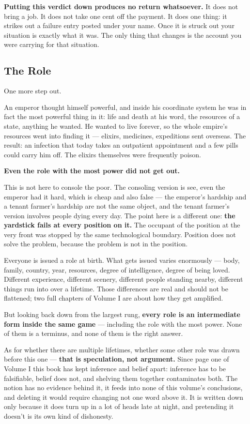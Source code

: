 \documentclass[11pt,a4paper]{article}
\begin{document}
\textbf{Putting this verdict down produces no return whatsoever.} It does not bring a job. It does not take one cent off the payment. It does one thing: it strikes out a failure entry posted under your name. Once it is struck out your situation is exactly what it was. The only thing that changes is the account you were carrying for that situation.

\subsection{The Role}

One more step out.

An emperor thought himself powerful, and inside his coordinate system he was in fact the most powerful thing in it: life and death at his word, the resources of a state, anything he wanted. He wanted to live forever, so the whole empire's resources went into finding it --- elixirs, medicines, expeditions sent overseas. The result: an infection that today takes an outpatient appointment and a few pills could carry him off. The elixirs themselves were frequently poison.

\textbf{Even the role with the most power did not get out.}

This is not here to console the poor. The consoling version is see, even the emperor had it hard, which is cheap and also false --- the emperor's hardship and a tenant farmer's hardship are not the same object, and the tenant farmer's version involves people dying every day. The point here is a different one: \textbf{the yardstick fails at every position on it.} The occupant of the position at the very front was stopped by the same technological boundary. Position does not solve the problem, because the problem is not in the position.

Everyone is issued a role at birth. What gets issued varies enormously --- body, family, country, year, resources, degree of intelligence, degree of being loved. Different experience, different scenery, different people standing nearby, different things run into over a lifetime. Those differences are real and should not be flattened; two full chapters of Volume I are about how they get amplified.

But looking back down from the largest rung, \textbf{every role is an intermediate form inside the same game} --- including the role with the most power. None of them is a terminus, and none of them is the right answer.

As for whether there are multiple lifetimes, whether some other role was drawn before this one --- \textbf{that is speculation, not argument.} Since page one of Volume I this book has kept inference and belief apart: inference has to be falsifiable, belief does not, and shelving them together contaminates both. The notion has no evidence behind it, it feeds into none of this volume's conclusions, and deleting it would require changing not one word above it. It is written down only because it does turn up in a lot of heads late at night, and pretending it doesn't is its own kind of dishonesty.
\end{document}
